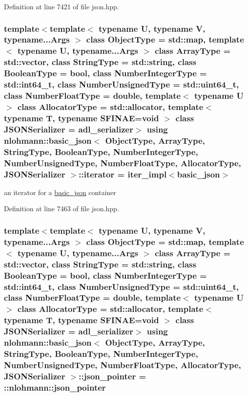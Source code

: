 Definition at line 7421 of file json.\+hpp.

\subsubsection[{\texorpdfstring{iterator}{iterator}}]{\setlength{\rightskip}{0pt plus 5cm}template$<$template$<$ typename U, typename V, typename...\+Args $>$ class Object\+Type = std\+::map, template$<$ typename U, typename...\+Args $>$ class Array\+Type = std\+::vector, class String\+Type  = std\+::string, class Boolean\+Type  = bool, class Number\+Integer\+Type  = std\+::int64\+\_\+t, class Number\+Unsigned\+Type  = std\+::uint64\+\_\+t, class Number\+Float\+Type  = double, template$<$ typename U $>$ class Allocator\+Type = std\+::allocator, template$<$ typename T, typename S\+F\+I\+N\+A\+E=void $>$ class J\+S\+O\+N\+Serializer = adl\+\_\+serializer$>$ using {\bf nlohmann\+::basic\+\_\+json}$<$ Object\+Type, Array\+Type, String\+Type, Boolean\+Type, Number\+Integer\+Type, Number\+Unsigned\+Type, Number\+Float\+Type, Allocator\+Type, J\+S\+O\+N\+Serializer $>$\+::{\bf iterator} =  {\bf iter\+\_\+impl}$<${\bf basic\+\_\+json}$>$}\hypertarget{classnlohmann_1_1basic__json_a099316232c76c034030a38faa6e34dca}{}\label{classnlohmann_1_1basic__json_a099316232c76c034030a38faa6e34dca}


an iterator for a \hyperlink{classnlohmann_1_1basic__json}{basic\+\_\+json} container 



Definition at line 7463 of file json.\+hpp.

\subsubsection[{\texorpdfstring{json\+\_\+pointer}{json_pointer}}]{\setlength{\rightskip}{0pt plus 5cm}template$<$template$<$ typename U, typename V, typename...\+Args $>$ class Object\+Type = std\+::map, template$<$ typename U, typename...\+Args $>$ class Array\+Type = std\+::vector, class String\+Type  = std\+::string, class Boolean\+Type  = bool, class Number\+Integer\+Type  = std\+::int64\+\_\+t, class Number\+Unsigned\+Type  = std\+::uint64\+\_\+t, class Number\+Float\+Type  = double, template$<$ typename U $>$ class Allocator\+Type = std\+::allocator, template$<$ typename T, typename S\+F\+I\+N\+A\+E=void $>$ class J\+S\+O\+N\+Serializer = adl\+\_\+serializer$>$ using {\bf nlohmann\+::basic\+\_\+json}$<$ Object\+Type, Array\+Type, String\+Type, Boolean\+Type, Number\+Integer\+Type, Number\+Unsigned\+Type, Number\+Float\+Type, Allocator\+Type, J\+S\+O\+N\+Serializer $>$\+::{\bf json\+\_\+pointer} =  \+::{\bf nlohmann\+::json\+\_\+pointer}}\hypertarget{classnlohmann_1_1basic__json_a32d3ee58bf01b28d11366f307518bf34}{}\label{classnlohmann_1_1basic__json_a32d3ee58bf01b28d11366f307518bf34}


